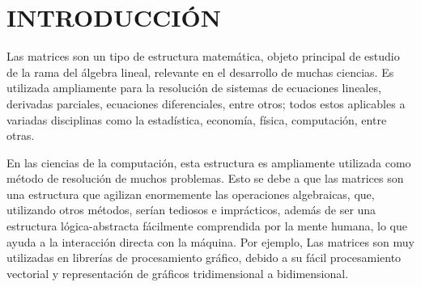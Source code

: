 \documentclass[11pt, twocolumn]{llncs}
\begin{document}

\section{INTRODUCCIÓN}
Las matrices son un tipo de estructura matemática, objeto principal de estudio de la rama del álgebra lineal, relevante en el desarrollo de muchas ciencias. Es utilizada ampliamente para la resolución de sistemas de ecuaciones lineales, derivadas parciales, ecuaciones diferenciales, entre otros; todos estos aplicables a variadas disciplinas como la estadística, economía, física, computación, entre otras.

En las ciencias de la computación, esta estructura es ampliamente utilizada como método de resolución de muchos problemas. Esto se debe a que las matrices son una estructura que agilizan enormemente las operaciones algebraicas, que, utilizando otros métodos, serían tediosos e imprácticos, además de ser una estructura lógica-abstracta fácilmente comprendida por la mente humana, lo que ayuda a la interacción directa con la máquina. Por ejemplo, Las matrices son muy utilizadas en librerías de procesamiento gráfico, debido a su fácil procesamiento vectorial y representación de gráficos tridimensional a bidimensional. 
\end{document}
